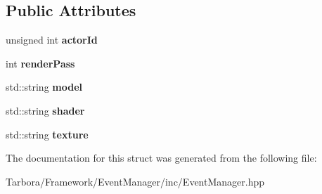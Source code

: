 \subsection*{Public Attributes}
\begin{DoxyCompactItemize}
\item 
\mbox{\label{structTarbora_1_1CreateActorModelEvent_a64e9ea2c833592aa24c2b02d46574856}} 
unsigned int {\bfseries actor\+Id}
\item 
\mbox{\label{structTarbora_1_1CreateActorModelEvent_aed5af1eb4a40605353dd05f7c4f5622b}} 
int {\bfseries render\+Pass}
\item 
\mbox{\label{structTarbora_1_1CreateActorModelEvent_a54c997ebb19f21f43bbdba437b08dd55}} 
std\+::string {\bfseries model}
\item 
\mbox{\label{structTarbora_1_1CreateActorModelEvent_a3474ba84ba74b3582d616fe53e7f3c49}} 
std\+::string {\bfseries shader}
\item 
\mbox{\label{structTarbora_1_1CreateActorModelEvent_a811ccfbcf210e442b21778c7057cc042}} 
std\+::string {\bfseries texture}
\end{DoxyCompactItemize}


The documentation for this struct was generated from the following file\+:\begin{DoxyCompactItemize}
\item 
Tarbora/\+Framework/\+Event\+Manager/inc/Event\+Manager.\+hpp\end{DoxyCompactItemize}
